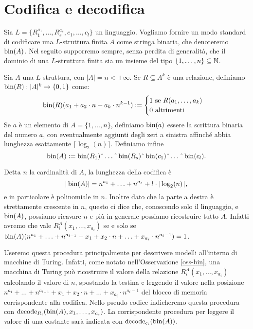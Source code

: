 \section{Codifica e decodifica}
Sia $L=\{R^{a_1}_1, \ldots, R^{a_s}_s, c_1, \ldots, c_l\}$ un linguaggio.
Vogliamo fornire un modo standard di codificare una $L$-struttura finita $A$ come
stringa binaria, che denoteremo $\operatorname{bin}(A)$. Nel seguito supporremo sempre, senza
perdita di generalità, che
il dominio di una $L$-struttura finita sia un insieme del tipo
$\{1,\ldots,n\} \subseteq \mathbb{N}$.

\begin{definizione}
  Sia $A$ una $L$-struttura, con $|A| = n < +\infty$.
  Se $R \subseteq A^k$ è una relazione,
  definiamo $\operatorname{bin}(R): |A|^k \to \{0,1\}$ come:
  \[\operatorname{bin}(R)(a_1 + a_2 \cdot n + a_k \cdot n^{k-1}):=
    \begin{cases}
      1 \mbox{ se } R(a_1,\ldots,a_k) \\
      0 \mbox{ altrimenti}
    \end{cases}
  \]
  Se $a$ è un elemento di $A=\{1,\ldots,n\}$, definiamo $\operatorname{bin}(a)$ essere la
  scrittura binaria del numero $a$, con eventualmente aggiunti degli zeri a
  sinistra affinché abbia lunghezza esattamente $\lceil \log_2(n) \rceil$.
  Definiamo infine
  \[\bin(A):=\bin(R_1)\string^\ldots\string^\bin(R_s)\string^\bin(c_1)\string^\ldots\string^\bin(c_l).\]
\end{definizione}

\begin{osservazione}
\label{oss-bin}
 Detta $n$ la cardinalità di $A$, la lunghezza della codifica è
 \[ |\operatorname{bin}(A)|=n^{a_1} + \ldots + n^{a_s} + l \cdot \lceil \log_2(n) \rceil, \]
 e in particolare è polinomiale in $n$. Inoltre dato che la parte a destra è
 strettamente crescente in $n$, questo ci dice che, conoscendo solo il linguaggio,
 e $\operatorname{bin}(A)$, possiamo ricavare $n$ e più in generale possiamo ricostruire tutto $A$.
 Infatti avremo che vale $R_i^A(x_1,\ldots, x_{a_i})$ se e solo se
 $\operatorname{bin}(A)(n^{a_1} + \ldots + n^{a_{i-1}} + x_1 + x_2 \cdot n + \ldots + x_{a_i} \cdot n^{a_i-1}) = 1$.
\end{osservazione}
Useremo questa procedura principalmente per descrivere modelli all'interno
di macchine di Turing. Infatti, come notato nell'Osservazione \ref{oss-bin},
una macchina di Turing può ricostruire
il valore della relazione $R_i^A(x_1, \ldots, x_{a_i})$ calcolando il valore
di $n$, spostando la testina e leggendo il valore nella posizione
$n^{a_1} + \ldots + n^{a_{i-1}} + x_1 + x_2 \cdot n + \ldots + x_{a_i} \cdot n^{a_i-1}$
del blocco di memoria corrispondente alla codifica.
Nello pseudo-codice indicheremo questa procedura con
$\operatorname{decode}_{R_i}(\operatorname{bin}(A), x_1, \ldots, x_{a_i})$. La corrispondente procedura per
leggere il valore di una costante sarà indicata con $\operatorname{decode}_{c_i} (\operatorname{bin}(A))$.

